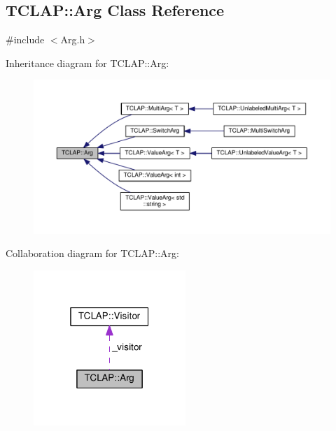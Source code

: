 \hypertarget{classTCLAP_1_1Arg}{}\subsection{T\+C\+L\+AP\+:\+:Arg Class Reference}
\label{classTCLAP_1_1Arg}


{\ttfamily \#include $<$Arg.\+h$>$}



Inheritance diagram for T\+C\+L\+AP\+:\+:Arg\+:
\nopagebreak
\begin{figure}[H]
\begin{center}
\leavevmode
\includegraphics[width=350pt]{classTCLAP_1_1Arg__inherit__graph}
\end{center}
\end{figure}


Collaboration diagram for T\+C\+L\+AP\+:\+:Arg\+:
\nopagebreak
\begin{figure}[H]
\begin{center}
\leavevmode
\includegraphics[width=163pt]{classTCLAP_1_1Arg__coll__graph}
\end{center}
\end{figure}
